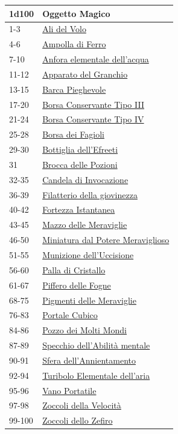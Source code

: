 \begin{multicols}{2}
{{\small\begin{tabularx}{0.45\textwidth}{lX}
		\toprule
\textbf{1d100} & \textbf{Oggetto Magico}\\
\toprule
1-3 & \hyperlink{AlidelVolo}{Ali del Volo}\\
4-6 & \hyperlink{AmpolladiFerro}{Ampolla di Ferro}\\
7-10 & \hyperlink{Anforaelementaledell'acqua}{Anfora elementale dell'acqua}\\
11-12 & \hyperlink{ApparatodelGranchio}{Apparato del Granchio}\\
13-15 & \hyperlink{BarcaPieghevole}{Barca Pieghevole}\\
17-20 & \hyperlink{BorsaConservanteTipoIII}{Borsa Conservante Tipo III}\\
21-24 & \hyperlink{BorsaConservanteTipoIV}{Borsa Conservante Tipo IV}\\
25-28 & \hyperlink{BorsadeiFagioli}{Borsa dei Fagioli}\\
29-30 & \hyperlink{Bottigliadell'Efreeti}{Bottiglia dell'Efreeti}\\
31 & \hyperlink{BroccadellePozioni}{Brocca delle Pozioni}\\
32-35 & \hyperlink{CandeladiInvocazione}{Candela di Invocazione}\\
36-39 & \hyperlink{Filatteriodellagiovinezza}{Filatterio della giovinezza}\\
40-42 & \hyperlink{FortezzaIstantanea}{Fortezza Istantanea}\\
43-45 & \hyperlink{MazzodelleMeraviglie}{Mazzo delle Meraviglie}\\
46-50 & \hyperlink{Miniatura dal Potere Meraviglioso}{Miniatura dal Potere Meraviglioso}\\
51-55 & \hyperlink{Munizionedell'Uccisione}{Munizione dell'Uccisione}\\
56-60 & \hyperlink{PalladiCristallo}{Palla di Cristallo}\\
61-67 & \hyperlink{PifferodelleFogne}{Piffero delle Fogne}\\
68-75 & \hyperlink{PigmentidelleMeraviglie}{Pigmenti delle Meraviglie}\\
76-83 & \hyperlink{PortaleCubico}{Portale Cubico}\\
84-86 & \hyperlink{PozzodeiMoltiMondi}{Pozzo dei Molti Mondi}\\
87-89 & \hyperlink{Specchio dell'Abilità mentale}{Specchio dell'Abilità mentale}\\
90-91 & \hyperlink{Sferadell'Annientamento}{Sfera dell'Annientamento}\\
92-94 & \hyperlink{TuriboloElementaledell'aria}{Turibolo Elementale dell'aria}\\
95-96 & \hyperlink{VanoPortatile}{Vano Portatile}\\
97-98 & \hyperlink{ZoccolidellaVelocità}{Zoccoli della Velocità}\\
99-100 & \hyperlink{ZoccolidelloZefiro}{Zoccoli dello Zefiro}
\end{tabularx}}

}
\end{multicols}
